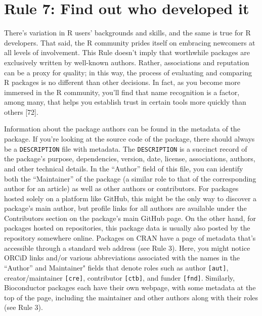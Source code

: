 \documentclass[10pt,letterpaper]{article}
\begin{document}
\hypertarget{rule-7-find-out-who-developed-it}{%
\section{Rule 7: Find out who developed
it}\label{rule-7-find-out-who-developed-it}}

There's variation in R users' backgrounds and skills, and the same is
true for R developers. That said, the R community prides itself on
embracing newcomers at all levels of involvement. This Rule doesn't
imply that worthwhile packages are exclusively written by well-known
authors. Rather, associations and reputation can be a proxy for quality;
in this way, the process of evaluating and comparing R packages is no
different than other decisions. In fact, as you become more immersed in
the R community, you'll find that name recognition is a factor, among
many, that helps you establish trust in certain tools more quickly than
others {[}72{]}.

Information about the package authors can be found in the metadata of
the package. If you're looking at the source code of the package, there
should always be a \texttt{DESCRIPTION} file with metadata. The
\texttt{DESCRIPTION} is a succinct record of the package's purpose,
dependencies, version, date, license, associations, authors, and other
technical details. In the ``Author'' field of this file, you can
identify both the ``Maintainer'' of the package (a similar role to that
of the corresponding author for an article) as well as other authors or
contributors. For packages hosted solely on a platform like GitHub, this
might be the only way to discover a package's main author, but profile
links for all authors are available under the Contributors section on
the package's main GitHub page. On the other hand, for packages hosted
on repositories, this package data is usually also posted by the
repository somewhere online. Packages on CRAN have a page of metadata
that's accessible through a standard web address (see Rule 3). Here, you
might notice ORCiD links and/or various abbreviations associated with
the names in the ``Author'' and Maintainer" fields that denote roles
such as author \texttt{{[}aut{]}}, creator/maintainer
\texttt{{[}cre{]}}, contributor \texttt{{[}ctb{]}}, and funder
\texttt{{[}fnd{]}}. Similarly, Bioconductor packages each have their own
webpage, with some metadata at the top of the page, including the
maintainer and other authors along with their roles (see Rule 3).
\end{document}
